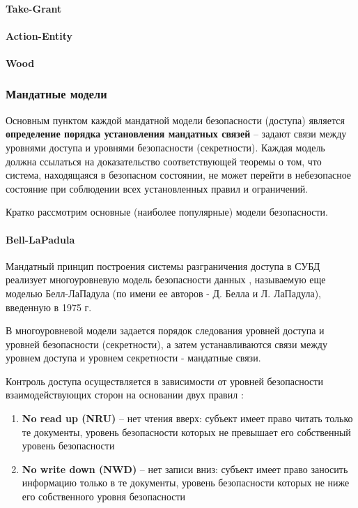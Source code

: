 \paragraph{Take-Grant}
\paragraph{Action-Entity}
\paragraph{Wood}

\subsubsection{Мандатные модели}

Основным пунктом каждой мандатной модели безопасности (доступа) является \textbf{определение порядка установления 
мандатных связей} -- задают связи между уровнями доступа и уровнями безопасности (секретности). Каждая модель 
должна ссылаться на доказательство соответствующей теоремы о том, что система, находящаяся в безопасном 
состоянии, не может перейти в небезопасное состояние при соблюдении всех установленных правил и ограничений.

Кратко рассмотрим основные (наиболее популярные) модели безопасности.

\paragraph{Bell-LaPadula}

Мандатный принцип построения системы разграничения доступа в СУБД реализует многоуровневую модель безопасности 
данных \autocite{Skakun}, называемую еще моделью Белл-ЛаПадула (по имени ее авторов - Д. Белла и Л. ЛаПадула), 
введенную в 1975 г.

В многоуровневой модели задается порядок следования уровней доступа и уровней безопасности (секретности), 
а затем устанавливаются связи между уровнем доступа и уровнем секретности - мандатные связи.

Контроль доступа осуществляется в зависимости от уровней безопасности взаимодействующих сторон на 
основании двух правил \autocite{URFULecture10Models}:
\begin{enumerate}
    \item \textbf{No read up (NRU)} – нет чтения вверх: субъект имеет право читать только те документы, 
    уровень безопасности которых не превышает его собственный уровень безопасности

    \item \textbf{No write down (NWD)} – нет записи вниз: субъект имеет право заносить информацию только 
    в те документы, уровень безопасности которых не ниже его собственного уровня безопасности
\end{enumerate}

